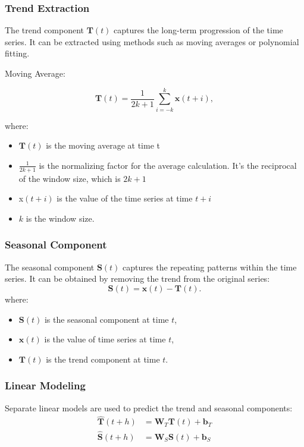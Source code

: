 \documentclass{ieeeojies}
\begin{document}
\subsubsection{Trend Extraction}
The trend component $\mathbf{T}(t)$ captures the long-term progression of the time series. It can be extracted using methods such as moving averages or polynomial fitting.

Moving Average:

\begin{equation}
    \mathbf{T}(t) = \frac{1}{2k+1} \sum_{i=-k}^{k} \mathbf{x}(t+i),
\end{equation}

where:
\begin{itemize}
    \item $\mathbf{T}(t)$ is the moving average at time t
    \item $\frac{1}{2k+1}$ is the normalizing factor for the average calculation. It's the reciprocal of the window size, which is $2k+1$
    \item x$(t+i)$ is the value of the time series at time $t+i$
    \item $k$ is the window size.
\end{itemize}


\subsubsection{Seasonal Component}
The seasonal component $\mathbf{S}(t)$ captures the repeating patterns within the time series. It can be obtained by removing the trend from the original series:
\begin{equation}
    \mathbf{S}(t) = \mathbf{x}(t) - \mathbf{T}(t).
\end{equation}
where:
\begin{itemize}
    \item $\mathbf{S}(t)$ is the seasonal component at time $t$,
    \item $\mathbf{x}(t)$ is the value of time series at time $t$,
    \item $\mathbf{T}(t)$ is the trend component at time $t$.
\end{itemize}

\subsubsection{Linear Modeling}
Separate linear models are used to predict the trend and seasonal components:
\begin{align}
    \hat{\mathbf{T}}(t+h) & = \mathbf{W}_T \mathbf{T}(t) + \mathbf{b}_T \\
    \hat{\mathbf{S}}(t+h) & = \mathbf{W}_S \mathbf{S}(t) + \mathbf{b}_S
\end{align}
\end{document}
